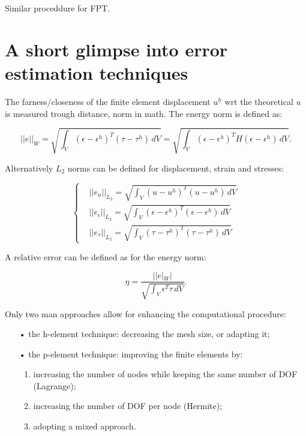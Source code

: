 	Similar proceddure for FPT. 
	
\section{A short glimpse into error estimation techniques}
	The farness/closeness of the finite element displacement $u^h$ wrt the theoretical $u$ is measured trough distance, norm in math. The energy norm is defined as: 
	
	\begin{equation}
	||e||_W = \sqrt{\int _V (\epsilon - \epsilon^h)^T(\tau - \tau ^h)\, dV} = \sqrt{\int _V (\epsilon - \epsilon^h)^TH(\epsilon - \epsilon^h)\, dV}.
	\end{equation}
	
	Alternatively $L_2$ norms can be defined for displacement, strain and stresses: 
	
	\begin{equation}
	\left\{
	\begin{aligned}
	&||e_u ||_{L_2} = \sqrt{\int _V (u - u^h)^T(u - u^h)\, dV}\\
	&||e_\epsilon ||_{L_2}= \sqrt{\int _V (\epsilon - \epsilon^h)^T(\epsilon - \epsilon^h)\, dV}\\
	&||e_\tau ||_{L_2} = \sqrt{\int _V (\tau- \tau^h)^T(\tau- \tau^h)\, dV}
	\end{aligned}
	\right.
	\end{equation}
	
	A relative error can be defined as for the energy norm: 
	
	\begin{equation}
	\eta = \frac{||e|_W|}{\sqrt{\int _V \epsilon ^T \tau \, dV}}.
	\end{equation}		
	
	Only two man approaches allow for enhancing the computational procedure: 
	\begin{itemize}
	\item[•] the h-element technique: decreasing the mesh size, or adapting it;
	\item[•] the p-element technique: improving the finite elements by:
	\begin{enumerate}
	\item	increasing the number of nodes while keeping the same number of DOF (Lagrange);
	\item increasing the number of DOF per node (Hermite);
	\item adopting a mixed approach.
	\end{enumerate}
	\end{itemize}
	
